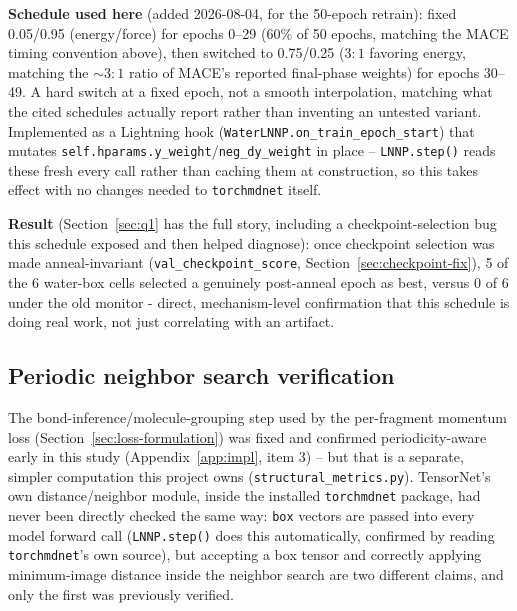 \documentclass[11pt]{article}
\begin{document}
\textbf{Schedule used here} (added 2026-08-04, for the 50-epoch retrain):
fixed 0.05/0.95 (energy/force) for epochs 0--29 (60\% of 50 epochs, matching
the MACE timing convention above), then switched to 0.75/0.25 ($3{:}1$
favoring energy, matching the $\sim3{:}1$ ratio of MACE's reported
final-phase weights) for epochs 30--49. A hard switch at a fixed epoch, not
a smooth interpolation, matching what the cited schedules actually report
rather than inventing an untested variant. Implemented as a Lightning hook
(\texttt{WaterLNNP.on\_train\_epoch\_start}) that mutates
\texttt{self.hparams.y\_weight}/\texttt{neg\_dy\_weight} in place --
\texttt{LNNP.step()} reads these fresh every call rather than caching them
at construction, so this takes effect with no changes needed to
\texttt{torchmdnet} itself.

\textbf{Result} (Section~\ref{sec:q1} has the full story, including a
checkpoint-selection bug this schedule exposed and then helped diagnose):
once checkpoint selection was made anneal-invariant
(\texttt{val\_checkpoint\_score}, Section~\ref{sec:checkpoint-fix}), 5 of the
6 water-box cells selected a genuinely post-anneal epoch as best, versus 0 of
6 under the old monitor - direct, mechanism-level confirmation that this
schedule is doing real work, not just correlating with an artifact.

\subsection{Periodic neighbor search verification}
\label{sec:periodicity}

The bond-inference/molecule-grouping step used by the per-fragment momentum
loss (Section~\ref{sec:loss-formulation}) was fixed and confirmed
periodicity-aware early in this study (Appendix~\ref{app:impl}, item 3) --
but that is a separate, simpler computation this project owns
(\texttt{structural\_metrics.py}). TensorNet's own distance/neighbor module,
inside the installed \texttt{torchmdnet} package, had never been directly
checked the same way: \texttt{box} vectors are passed into every model
forward call (\texttt{LNNP.step()} does this automatically, confirmed by
reading \texttt{torchmdnet}'s own source), but accepting a box tensor and
correctly applying minimum-image distance inside the neighbor search are two
different claims, and only the first was previously verified.
\end{document}
